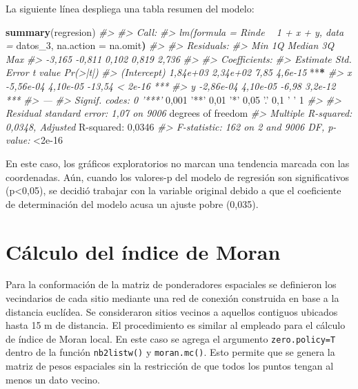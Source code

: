 \documentclass[11pt,b5paper,]{krantz}
\newenvironment{Shaded}{}{}
\newcommand{\KeywordTok}[1]{\textcolor[rgb]{0.00,0.44,0.13}{\textbf{#1}}}
\newcommand{\DecValTok}[1]{\textcolor[rgb]{0.25,0.63,0.44}{#1}}
\newcommand{\FloatTok}[1]{\textcolor[rgb]{0.25,0.63,0.44}{#1}}
\newcommand{\StringTok}[1]{\textcolor[rgb]{0.25,0.44,0.63}{#1}}
\newcommand{\CommentTok}[1]{\textcolor[rgb]{0.38,0.63,0.69}{\textit{#1}}}
\newcommand{\OperatorTok}[1]{\textcolor[rgb]{0.40,0.40,0.40}{#1}}
\newcommand{\ErrorTok}[1]{\textcolor[rgb]{1.00,0.00,0.00}{\textbf{#1}}}
\newcommand{\NormalTok}[1]{#1}
\begin{document}
La siguiente línea despliega una tabla resumen del modelo:

\begin{Shaded}
\begin{Highlighting}[]
\KeywordTok{summary}\NormalTok{(regresion)}
\CommentTok{#>}
\CommentTok{#> Call:}
\CommentTok{#> lm(formula = Rinde ~ 1 + x + y, data =}
\NormalTok{datos_}\DecValTok{3}\NormalTok{, na.action =}\StringTok{ }\NormalTok{na.omit}\ErrorTok{)}
\CommentTok{#>}
\CommentTok{#> Residuals:}
\CommentTok{#> Min 1Q Median 3Q Max}
\CommentTok{#> -3,165 -0,811 0,102 0,819 2,736}
\CommentTok{#>}
\CommentTok{#> Coefficients:}
\CommentTok{#> Estimate Std. Error t value Pr(>|t|)}
\CommentTok{#> (Intercept) 1,84e+03 2,34e+02 7,85 4,6e-15}
\OperatorTok{**}\ErrorTok{*}
\CommentTok{#> x -5,56e-04 4,10e-05 -13,54 < 2e-16 ***}
\CommentTok{#> y -2,86e-04 4,10e-05 -6,98 3,2e-12 ***}
\CommentTok{#> ---}
\CommentTok{#> Signif. codes: 0 '***'}
\StringTok{    }\DecValTok{0}\NormalTok{,}\DecValTok{001} \StringTok{'**'}
    \DecValTok{0}\NormalTok{,}\DecValTok{01} \StringTok{'*'}
\DecValTok{0}\NormalTok{,}\DecValTok{05} \StringTok{'.'}
    \DecValTok{0}\NormalTok{,}\DecValTok{1} \StringTok{'}
\StringTok{    '}
    \DecValTok{1}
\CommentTok{#>}
\CommentTok{#> Residual standard error: 1,07 on 9006}
\NormalTok{degrees of freedom}
\CommentTok{#> Multiple R-squared: 0,0348, Adjusted}
\NormalTok{R}\OperatorTok{-}\NormalTok{squared}\OperatorTok{:}\StringTok{ }\DecValTok{0}\NormalTok{,}\DecValTok{0346}
\CommentTok{#> F-statistic: 162 on 2 and 9006 DF, p-value:}
\OperatorTok{<}\FloatTok{2e-16}
\end{Highlighting}
\end{Shaded}

En este caso, los gráficos exploratorios no marcan una tendencia marcada
con las coordenadas. Aún, cuando los valores-p del modelo de regresión
son significativos (p\textless{}0,05), se decidió trabajar con la
variable original debido a que el coeficiente de determinación del
modelo acusa un ajuste pobre (0,035).

\section{Cálculo del índice de
Moran}\label{cuxe1lculo-del-uxedndice-de-moran}

Para la conformación de la matriz de ponderadores espaciales se
definieron los vecindarios de cada sitio mediante una red de conexión
construida en base a la distancia euclídea. Se consideraron sitios
vecinos a aquellos contiguos ubicados hasta 15 m de distancia. El
procedimiento es similar al empleado para el cálculo de índice de Moran
local. En este caso se agrega el argumento \texttt{zero.policy=T} dentro
de la función \texttt{nb2listw()} y \texttt{moran.mc()}. Esto permite
que se genera la matriz de pesos espaciales sin la restricción de que
todos los puntos tengan al menos un dato vecino.
\end{document}
